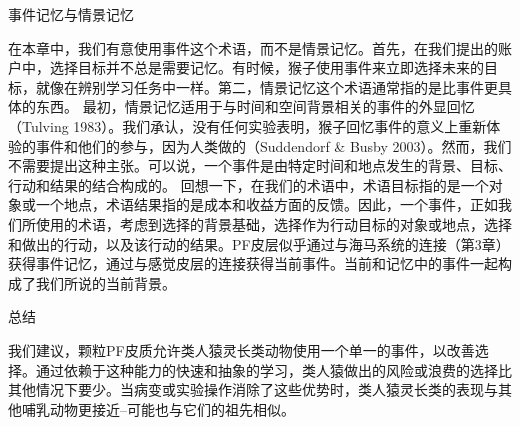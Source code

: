 事件记忆与情景记忆

在本章中，我们有意使用事件这个术语，而不是情景记忆。首先，在我们提出的账户中，选择目标并不总是需要记忆。有时候，猴子使用事件来立即选择未来的目标，就像在辨别学习任务中一样。第二，情景记忆这个术语通常指的是比事件更具体的东西。
最初，情景记忆适用于与时间和空间背景相关的事件的外显回忆（Tulving 1983）。我们承认，没有任何实验表明，猴子回忆事件的意义上重新体验的事件和他们的参与，因为人类做的（Suddendorf \& Busby 2003）。然而，我们不需要提出这种主张。可以说，一个事件是由特定时间和地点发生的背景、目标、行动和结果的结合构成的。
回想一下，在我们的术语中，术语目标指的是一个对象或一个地点，术语结果指的是成本和收益方面的反馈。因此，一个事件，正如我们所使用的术语，考虑到选择的背景基础，选择作为行动目标的对象或地点，选择和做出的行动，以及该行动的结果。PF皮层似乎通过与海马系统的连接（第3章）获得事件记忆，通过与感觉皮层的连接获得当前事件。当前和记忆中的事件一起构成了我们所说的当前背景。

总结

我们建议，颗粒PF皮质允许类人猿灵长类动物使用一个单一的事件，以改善选择。通过依赖于这种能力的快速和抽象的学习，类人猿做出的风险或浪费的选择比其他情况下要少。当病变或实验操作消除了这些优势时，类人猿灵长类的表现与其他哺乳动物更接近--可能也与它们的祖先相似。

